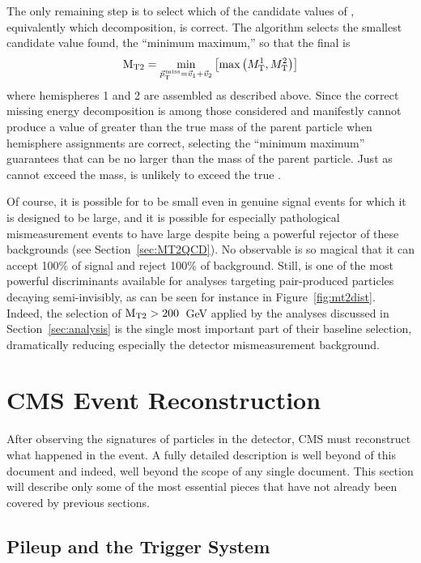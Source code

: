     The only remaining step is to select which of the candidate values of \mttwo, equivalently which \ptvecmiss decomposition, is correct.
    The algorithm selects the smallest candidate \mttwo value found, the ``minimum maximum,'' so that the final \mttwo is
    \begin{equation} \label{eqn:minmax}
      \mathrm{M_{T2}} = \underset{{\vec p}_{\mathrm{T}}^{\kern1pt\text{miss}} = \vec{v}_1+\vec{v}_2}{\min}\left[\max\left(M_{\mathrm{T}}^1,M_{\mathrm{T}}^2\right)\right]
    \end{equation}
    where hemispheres 1 and 2 are assembled as described above.
    Since the correct missing energy decomposition is among those considered and manifestly cannot produce a value of \Mt greater than the true mass of the parent particle when hemisphere assignments are correct, selecting the ``minimum maximum'' guarantees that \mttwo can be no larger than the mass of the parent particle. 
    Just as \Mt cannot exceed the mass, \mttwo is unlikely to exceed the true \Mt.

    Of course, it is possible for \mttwo to be small even in genuine signal events for which it is designed to be large, and it is possible for especially pathological mismeasurement events to have large \mttwo despite \mttwo being a powerful rejector of these backgrounds (see Section~\ref{sec:MT2QCD}).
    No observable is so magical that it can accept 100\% of signal and reject 100\% of background.
    Still, \mttwo is one of the most powerful discriminants available for analyses targeting pair-produced particles decaying semi-invisibly, as can be seen for instance in Figure~\ref{fig:mt2dist}.
    Indeed, the selection of $\mathrm{M_{T2}} > 200$~GeV applied by the analyses discussed in Section~\ref{sec:analysis} is the single most important part of their baseline selection, dramatically reducing especially the detector mismeasurement background.

\section{CMS Event Reconstruction} \label{sec:reconstruction}

After observing the signatures of particles in the detector, CMS must reconstruct what happened in the event.
A fully detailed description is well beyond of this document and indeed, well beyond the scope of any single document.
This section will describe only some of the most essential pieces that have not already been covered by previous sections.

  \subsection{Pileup and the Trigger System} \label{sec:pileupandtrigger}

